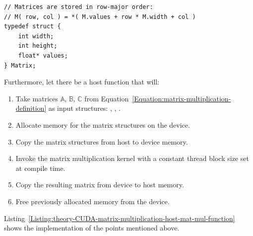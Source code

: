 \begin{lstlisting}[caption={Definition of the structure that will represent a matrix. The \code{width} variable stores the number of columns and \code{height} stores the number of rows the matrix has. The elements of the matrix are stored in row-major order in the single-precision (float) array: \code{values}. Taken from Nvidia's \emph{CUDA C++ Programming Guide} \cite{NVIDIAMay2022}.},label={Listing:theory-CUDA-matrix-multiplication-matrix-structure-definition}]
// Matrices are stored in row-major order:
// M( row, col ) = *( M.values + row * M.width + col )
typedef struct {
	int width;
	int height;
	float* values;
} Matrix;
\end{lstlisting}

Furthermore, let there be a host function  that will:

\begin{enumerate}
	\item Take matrices $ \mathbb{A} $, $ \mathbb{B} $, $ \mathbb{C} $ from Equation~\ref{Equation:matrix-multiplication-definition} as input structures: , , .
	\item Allocate memory for the matrix structures on the device.
	\item Copy the matrix structures from host to device memory.
	\item Invoke the matrix multiplication kernel with a constant thread block size set at compile time.
	\item Copy the resulting matrix from device to host memory.
	\item Free previously allocated memory from the device.
\end{enumerate}

Listing~\ref{Listing:theory-CUDA-matrix-multiplication-host-mat-mul-function} shows the implementation of the points mentioned above.

